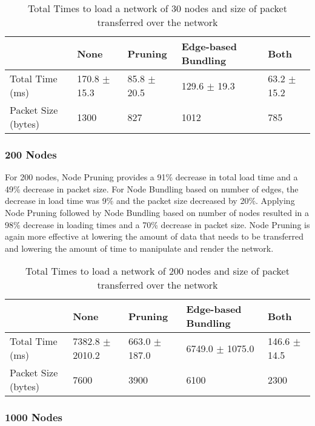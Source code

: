 \documentclass[../dissertation.tex]{subfiles}
\begin{document}
\begin{table}[H]
\centering
\begin{tabular}{|l|l|l|l|l|}
\hline
                    & \textbf{None}    & \textbf{Pruning} & \textbf{Edge-based Bundling}    & \textbf{Both}   \\ \hline
Total Time (ms)     & 170.8 $\pm$ 15.3 & 85.8 $\pm$ 20.5  & 129.6 $\pm$ 19.3 & 63.2 $\pm$ 15.2 \\ \hline
Packet Size (bytes) & 1300             & 827              & 1012             & 785             \\ \hline
\end{tabular}
\caption{Total Times to load a network of 30 nodes and size of packet transferred over the network}
\label{table:30-nodes}
\end{table}

\subsubsection{200 Nodes}

For 200 nodes, Node Pruning provides a 91\% decrease in total load time and a 49\% decrease in packet size. For Node Bundling based on number of edges, the decrease in load time was 9\% and the packet size decreased by 20\%. Applying Node Pruning followed by Node Bundling based on number of nodes resulted in a 98\% decrease in loading times and a 70\% decrease in packet size. Node Pruning is again more effective at lowering the amount of data that needs to be transferred and lowering the amount of time to manipulate and render the network.

\begin{table}[H]
\centering
\begin{tabular}{|l|l|l|l|l|}
\hline
                    & \textbf{None}       & \textbf{Pruning}  & \textbf{Edge-based Bundling}       & \textbf{Both}    \\ \hline
Total Time (ms)     & 7382.8 $\pm$ 2010.2 & 663.0 $\pm$ 187.0 & 6749.0 $\pm$ 1075.0 & 146.6 $\pm$ 14.5 \\ \hline
Packet Size (bytes) & 7600                & 3900              & 6100                & 2300             \\ \hline
\end{tabular}
\caption{Total Times to load a network of 200 nodes and size of packet transferred over the network}
\label{table:200-nodes}
\end{table}

\subsubsection{1000 Nodes}
\end{document}
